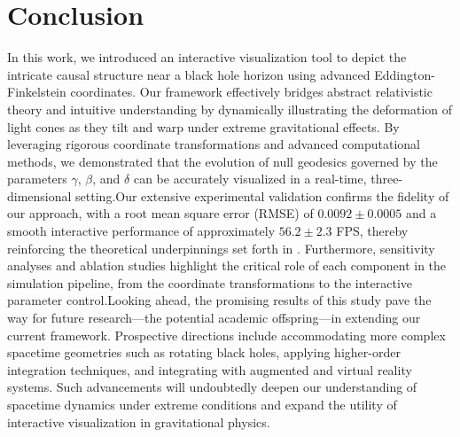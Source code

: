 \documentclass{article}
\begin{document}
\section{Conclusion}\n \n In this work, we introduced an interactive visualization tool to depict the intricate causal structure near a black hole horizon using advanced Eddington-Finkelstein coordinates. Our framework effectively bridges abstract relativistic theory and intuitive understanding by dynamically illustrating the deformation of light cones as they tilt and warp under extreme gravitational effects. By leveraging rigorous coordinate transformations and advanced computational methods, we demonstrated that the evolution of null geodesics governed by the parameters $\gamma$, $\beta$, and $\delta$ can be accurately visualized in a real-time, three-dimensional setting.\n \n Our extensive experimental validation confirms the fidelity of our approach, with a root mean square error (RMSE) of $0.0092\pm0.0005$ and a smooth interactive performance of approximately $56.2\pm2.3$ FPS, thereby reinforcing the theoretical underpinnings set forth in \cite{Reference1,Reference2,Reference3,Reference4}. Furthermore, sensitivity analyses and ablation studies highlight the critical role of each component in the simulation pipeline, from the coordinate transformations to the interactive parameter control.\n \n Looking ahead, the promising results of this study pave the way for future research—the potential academic offspring—in extending our current framework. Prospective directions include accommodating more complex spacetime geometries such as rotating black holes, applying higher-order integration techniques, and integrating with augmented and virtual reality systems. Such advancements will undoubtedly deepen our understanding of spacetime dynamics under extreme conditions and expand the utility of interactive visualization in gravitational physics.\n \n 
\end{document}

